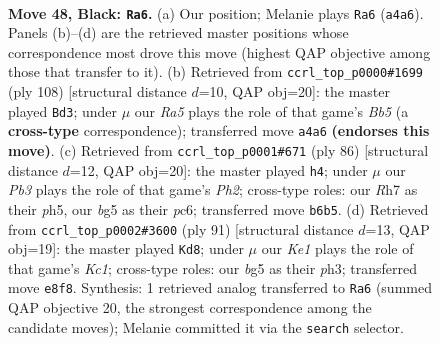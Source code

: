 \documentclass[11pt]{article}
\begin{document}
\clearpage

\begin{figure}[p]\centering
\begin{subfigure}{0.46\textwidth}\centering
\resizebox{\linewidth}{!}{%
\newchessgame
\chessboard[
  setfen={4k3/7r/1p4R1/6B1/rp1P4/3K4/8/8 b - - 0 48},
  showmover=false,
  pgfstyle=straightmove, color=movearrow, markmove={a4-a6}
]}
\caption{}
\end{subfigure}\hfill
\begin{subfigure}{0.46\textwidth}\centering
\resizebox{\linewidth}{!}{%
\newchessgame
\chessboard[
  setfen={8/2r2pk1/8/1B4p1/4K1P1/8/R1P2b2/8 w - - 0 55},
  showmover=false,
  pgfstyle=straightmove, color=movearrow, markmove={b5-d3}
]}
\caption{}
\end{subfigure}
\\[4pt]
\begin{subfigure}{0.46\textwidth}\centering
\resizebox{\linewidth}{!}{%
\newchessgame
\chessboard[
  setfen={8/4R3/2p3k1/7p/8/4P1P1/2r4P/4K3 w - - 1 44},
  showmover=false,
  pgfstyle=straightmove, color=movearrow, markmove={h2-h4}
]}
\caption{}
\end{subfigure}\hfill
\begin{subfigure}{0.46\textwidth}\centering
\resizebox{\linewidth}{!}{%
\newchessgame
\chessboard[
  setfen={2k5/2p4R/r5p1/4K1P1/8/7P/8/8 b - - 0 46},
  showmover=false,
  pgfstyle=straightmove, color=movearrow, markmove={c8-d8}
]}
\caption{}
\end{subfigure}
\caption{\textbf{Move 48, Black: \texttt{Ra6}.} (a) Our position; Melanie plays \texttt{Ra6} (\texttt{a4a6}). Panels (b)--(d) are the retrieved master positions whose correspondence most drove this move (highest QAP objective among those that transfer to it). (b) Retrieved from \texttt{ccrl\_top\_p0000\#1699} (ply 108) [structural distance $d$=10, QAP obj=20]: the master played \texttt{Bd3}; under $\mu$ our \emph{Ra5} plays the role of that game's \emph{Bb5} (a \textbf{cross-type} correspondence); transferred move \texttt{a4a6} \textbf{(endorses this move)}. (c) Retrieved from \texttt{ccrl\_top\_p0001\#671} (ply 86) [structural distance $d$=12, QAP obj=20]: the master played \texttt{h4}; under $\mu$ our \emph{Pb3} plays the role of that game's \emph{Ph2}; cross-type roles: our \emph{R}h7 as their \emph{p}h5, our \emph{b}g5 as their \emph{p}c6; transferred move \texttt{b6b5}. (d) Retrieved from \texttt{ccrl\_top\_p0002\#3600} (ply 91) [structural distance $d$=13, QAP obj=19]: the master played \texttt{Kd8}; under $\mu$ our \emph{Ke1} plays the role of that game's \emph{Kc1}; cross-type roles: our \emph{b}g5 as their \emph{p}h3; transferred move \texttt{e8f8}. Synthesis: 1 retrieved analog transferred to \texttt{Ra6} (summed QAP objective 20, the strongest correspondence among the candidate moves); Melanie committed it via the \texttt{search} selector.}
\label{fig:thought-m95}
\end{figure}
\end{document}
